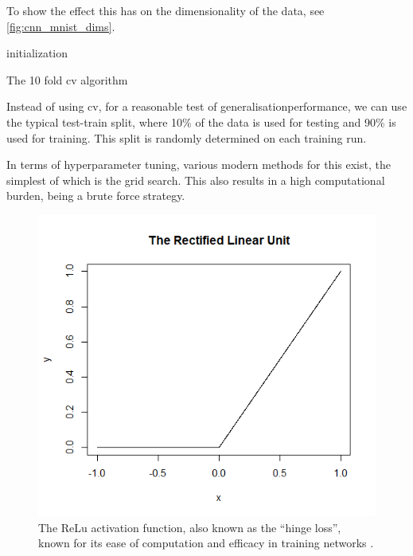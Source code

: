 To show the effect this has on the dimensionality of the data, see \ref{fig:cnn_mnist_dims}. 


\bigskip

\begin{algorithm}[H]
\SetAlgoLined
{}
 initialization\;
    \caption{The 10 fold \gls{cv} algorithm}
    \label{algo:10-fold-cv}
\end{algorithm}


\bigskip

Instead of using \gls{cv}, for a reasonable test of \gls{generalisationperformance}, we can use the typical test-train split, where 10\% of the data is used for testing and 90\% is used for training. This split is randomly determined on each training run.
\bigskip

In terms of \gls{hyperparameter} tuning, various modern methods for this exist, the simplest of which is the grid search. This also results in a high computational burden, being a brute force strategy. 
\bigskip

\begin{figure}
    \centering
    \includegraphics[scale=0.5]{figs/relu.png}
    \caption[The ReLu activation function.]{The ReLu activation function, also known as the \enquote{hinge loss}, known for its ease of computation and efficacy in training networks \cite{activation_search}.}
    \label{fig:relu_function}
\end{figure}

